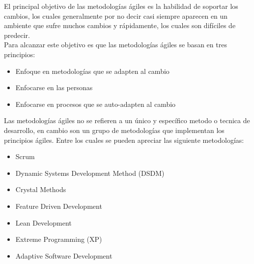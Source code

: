
   El principal objetivo de las metodologías ágiles es la habilidad de soportar los cambios, los cuales generalmente por no decir casi siempre aparecen en un ambiente que sufre muchos cambios y rápidamente, los cuales son difíciles de predecir.\cite{design2005}\\


   Para alcanzar este objetivo es que las metodologías ágiles se basan en tres principios: \cite{xpHutagalung}

\begin{itemize}
 \item Enfoque en metodologías que se adapten al cambio
 \item Enfocarse en las personas
 \item Enfocarse en procesos que se auto-adapten al cambio
\end{itemize}

   Las metodologías ágiles no se refieren a un único y específico metodo o tecnica de desarrollo, en cambio son un grupo de metodologías que implementan los principios ágiles. Entre los cuales se pueden apreciar las siguiente metodologías:\\

   \begin{itemize}
     \item Scrum
     \item Dynamic Systems Development Method (DSDM)
     \item Crystal Methods
     \item Feature Driven Development
     \item Lean Development
     \item Extreme Programming (XP)
     \item Adaptive Software Development
   \end{itemize}




